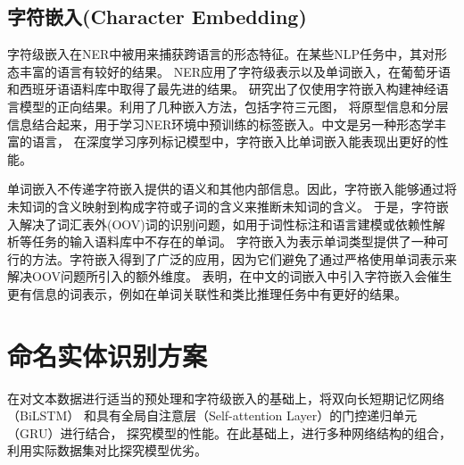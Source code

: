 

\subsection{字符嵌入(Character Embedding)}

字符级嵌入在NER中被用来捕获跨语言的形态特征。在某些NLP任务中，其对形态丰富的语言有较好的结果。
\parencite{santos2015boosting}NER应用了字符级表示以及单词嵌入，在葡萄牙语和西班牙语语料库中取得了最先进的结果。
\parencite{kim2016character}研究出了仅使用字符嵌入构建神经语言模型的正向结果。\parencite{ma2016end}利用了几种嵌入方法，包括字符三元图，
将原型信息和分层信息结合起来，用于学习NER环境中预训练的标签嵌入。中文是另一种形态学丰富的语言，
在深度学习序列标记模型中，字符嵌入比单词嵌入能表现出更好的性能\parencite{zheng2013deep}。

单词嵌入不传递字符嵌入提供的语义和其他内部信息。因此，字符嵌入能够通过将未知词的含义映射到构成字符或子词的含义来推断未知词的含义。
于是，字符嵌入解决了词汇表外(OOV)词的识别问题，如用于词性标注和语言建模或依赖性解析\parencite{ballesteros2015improved}等任务的输入语料库中不存在的单词。
字符嵌入为表示单词类型提供了一种可行的方法。字符嵌入得到了广泛的应用，因为它们避免了通过严格使用单词表示来解决OOV问题所引入的额外维度。
\parencite{chen2015joint}表明，在中文的词嵌入中引入字符嵌入会催生更有信息的词表示，例如在单词关联性和类比推理任务中有更好的结果。


\section{命名实体识别方案}

在对文本数据进行适当的预处理和字符级嵌入的基础上，将双向长短期记忆网络（BiLSTM）
和具有全局自注意层（Self-attention Layer）的门控递归单元（GRU）进行结合，
探究模型的性能。在此基础上，进行多种网络结构的组合，利用实际数据集对比探究模型优劣。



